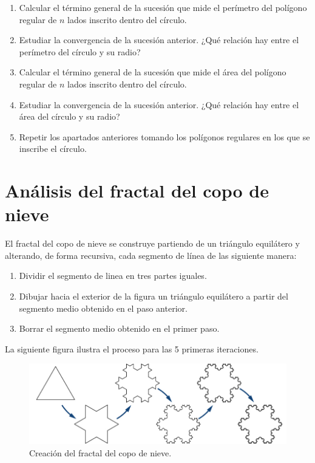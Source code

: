 \documentclass[
  a4paper,
]{scrreport}
\providecommand{\tightlist}{%
  \setlength{\itemsep}{0pt}\setlength{\parskip}{0pt}}\usepackage{longtable,booktabs,array}
\begin{document}
\begin{enumerate}
\def\labelenumi{\alph{enumi}.}
\item
  Calcular el término general de la sucesión que mide el perímetro del
  polígono regular de \(n\) lados inscrito dentro del círculo.
\item
  Estudiar la convergencia de la sucesión anterior. ¿Qué relación hay
  entre el perímetro del círculo y su radio?
\item
  Calcular el término general de la sucesión que mide el área del
  polígono regular de \(n\) lados inscrito dentro del círculo.
\item
  Estudiar la convergencia de la sucesión anterior. ¿Qué relación hay
  entre el área del círculo y su radio?
\item
  Repetir los apartados anteriores tomando los polígonos regulares en
  los que se inscribe el círculo.
\end{enumerate}


\hypertarget{anuxe1lisis-del-fractal-del-copo-de-nieve}{%
\chapter{Análisis del fractal del copo de
nieve}\label{anuxe1lisis-del-fractal-del-copo-de-nieve}}

El fractal del copo de nieve se construye partiendo de un triángulo
equilátero y alterando, de forma recursiva, cada segmento de línea de
las siguiente manera:

\begin{enumerate}
\def\labelenumi{\arabic{enumi}.}
\tightlist
\item
  Dividir el segmento de linea en tres partes iguales.
\item
  Dibujar hacia el exterior de la figura un triángulo equilátero a
  partir del segmento medio obtenido en el paso anterior.
\item
  Borrar el segmento medio obtenido en el primer paso.
\end{enumerate}

La siguiente figura ilustra el proceso para las 5 primeras iteraciones.

\begin{figure}

{\centering \includegraphics{img/series/copo-nieve.png}

}

\caption{Creación del fractal del copo de nieve.}

\end{figure}
\end{document}
